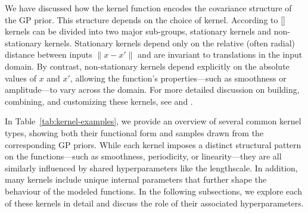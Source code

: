\documentclass{ucdgradtaughtthesis}
\begin{document}
\noindent
We have discussed how the kernel function encodes the covariance structure of the GP prior. This structure depends on the choice of kernel. According to [\cite{bible}]
kernels can be divided into two major sub-groups, stationary kernels and non-stationary kernels. 
Stationary kernels depend only on the relative (often radial) distance between inputs \(\|x - x'\|\) and are invariant to translations 
in the input domain. By contrast, non-stationary kernels depend explicitly on 
the absolute values of \(x\) and \(x'\), allowing the function’s properties—such as smoothness 
or amplitude—to vary across the domain. For more detailed discussion on building, combining, and customizing these kernels, 
see \cite{kernelcookbook} and \cite[Ch.~4]{bible}.

\bigskip

\noindent
In Table~\ref{tab:kernel-examples}, we provide an overview of several common kernel types, 
showing both their functional form and samples drawn from the corresponding GP priors. 
While each kernel imposes a distinct structural pattern on the functions—such as smoothness, periodicity, or linearity—they are all similarly influenced by shared hyperparameters like the lengthscale. 
In addition, many kernels include unique internal parameters that further shape the behaviour of the modeled functions. 
In the following subsections, we explore each of these kernels in detail and discuss the role of their associated hyperparameters.
\end{document}
